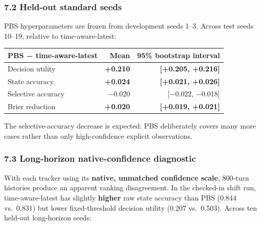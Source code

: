 \documentclass[
  10pt,
  letterpaper,
]{article}
\begin{document}
\subsubsection{7.2 Held-out standard
seeds}\label{held-out-standard-seeds}

PBS hyperparameters are frozen from development seeds 1--3. Across test
seeds 10--19, relative to time-aware-latest:

\begin{longtable}[]{@{}lrr@{}}
\toprule\noalign{}
PBS − time-aware-latest & Mean & 95\% bootstrap interval \\
\midrule\noalign{}
\endhead
\bottomrule\noalign{}
\endlastfoot
Decision utility & \textbf{+0.210} & \textbf{{[}+0.205, +0.216{]}} \\
State accuracy & \textbf{+0.024} & \textbf{{[}+0.021, +0.026{]}} \\
Selective accuracy & −0.020 & {[}−0.022, −0.018{]} \\
Brier reduction & \textbf{+0.020} & \textbf{{[}+0.019, +0.021{]}} \\
\end{longtable}

The selective-accuracy decrease is expected: PBS deliberately covers
many more cases rather than only high-confidence explicit observations.

\subsubsection{7.3 Long-horizon native-confidence
diagnostic}\label{long-horizon-native-confidence-diagnostic}

With each tracker using its \textbf{native, unmatched confidence scale},
800-turn histories produce an apparent ranking disagreement. In the
checked-in shift run, time-aware-latest has slightly \textbf{higher} raw
state accuracy than PBS (0.844 vs.~0.831) but lower fixed-threshold
decision utility (0.207 vs.~0.503). Across ten held-out long-horizon
seeds:
\end{document}
